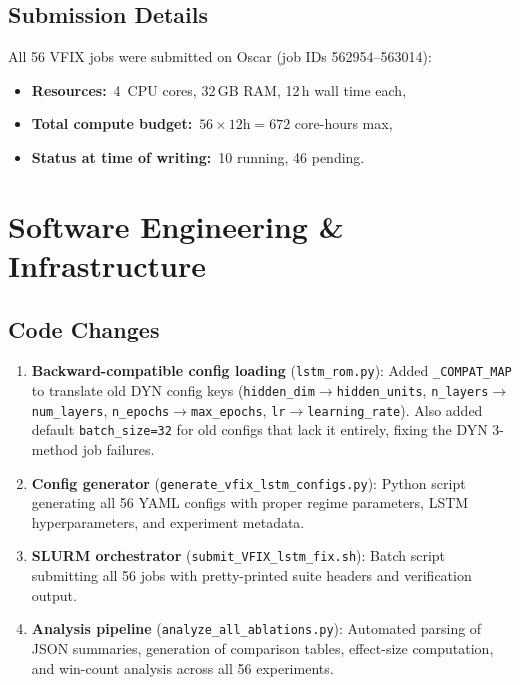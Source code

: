 \documentclass[11pt,letterpaper]{article}
\begin{document}
\subsection{Submission Details}
All 56 VFIX jobs were submitted on Oscar (job IDs 562954--563014):
\begin{itemize}[nosep]
  \item \textbf{Resources:}\ 4~CPU cores, 32\,GB RAM, 12\,h wall time each,
  \item \textbf{Total compute budget:}\ $56 \times 12\text{h} = 672$ core-hours max,
  \item \textbf{Status at time of writing:}\ 10 running, 46 pending.
\end{itemize}


\section{Software Engineering \& Infrastructure}
\label{sec:engineering}

\subsection{Code Changes}
\begin{enumerate}[nosep]
  \item \textbf{Backward-compatible config loading} (\texttt{lstm\_rom.py}):
        Added \texttt{\_COMPAT\_MAP} to translate old DYN config keys
        (\texttt{hidden\_dim}$\to$\texttt{hidden\_units},
         \texttt{n\_layers}$\to$\texttt{num\_layers},
         \texttt{n\_epochs}$\to$\texttt{max\_epochs},
         \texttt{lr}$\to$\texttt{learning\_rate}).
        Also added default \texttt{batch\_size=32} for old configs that lack it
        entirely, fixing the DYN 3-method job failures.
  \item \textbf{Config generator} (\texttt{generate\_vfix\_lstm\_configs.py}):
        Python script generating all 56 YAML configs with proper regime
        parameters, LSTM hyperparameters, and experiment metadata.
  \item \textbf{SLURM orchestrator} (\texttt{submit\_VFIX\_lstm\_fix.sh}):
        Batch script submitting all 56 jobs with pretty-printed suite headers
        and verification output.
  \item \textbf{Analysis pipeline} (\texttt{analyze\_all\_ablations.py}):
        Automated parsing of JSON summaries, generation of comparison tables,
        effect-size computation, and win-count analysis across all 56 experiments.
\end{enumerate}
\end{document}
